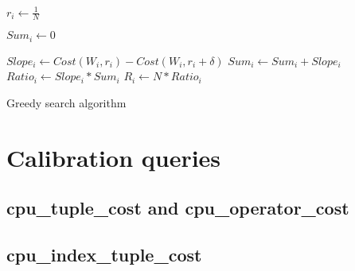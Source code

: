 \begin{algorithm}[H]
 \begin{algorithmic}
	\STATE $r_{i} \gets \frac{1}{N}$
    \ENDFOR
    
    \STATE $ Sum_{i} \gets 0 $
	\STATE {}

	\STATE $ Slope_{i} \gets Cost(W_{i},r_{i}) - Cost(W_{i},r_{i} + \delta)$
	\STATE $ Sum_{i} \gets Sum_{i} + Slope_{i} $
    \ENDFOR
	\STATE {}
	\STATE $ Ratio_{i} \gets Slope_{i} * Sum_{i} $
	\STATE $ R_{i} \gets N*Ratio_{i} $
    \ENDFOR

 \end{algorithmic}
  \caption{Greedy search algorithm}
\end{algorithm}

\section{Calibration queries}

\subsection{cpu\_tuple\_cost and cpu\_operator\_cost}
\label{app:cal1}


\subsection{cpu\_index\_tuple\_cost}
\label{app:cal2}

